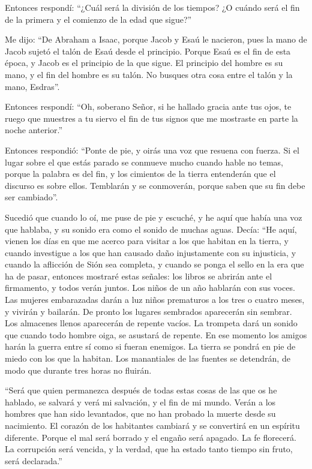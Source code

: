  Entonces respondí: ``¿Cuál será la división de los
tiempos? ¿O cuándo será el fin de la primera y el comienzo de la edad
que sigue?''

 Me dijo: ``De Abraham a Isaac, porque Jacob y Esaú le
nacieron, pues la mano de Jacob sujetó el talón de Esaú desde el
principio.  Porque Esaú es el fin de esta época, y Jacob
es el principio de la que sigue.  El principio del hombre
es su mano, y el fin del hombre es su talón. No busques otra cosa entre
el talón y la mano, Esdras''.

 Entonces respondí: ``Oh, soberano Señor, si he hallado
gracia ante tus ojos,  te ruego que muestres a tu siervo
el fin de tus signos que me mostraste en parte la noche anterior.''

 Entonces respondió: ``Ponte de pie, y oirás una voz que
resuena con fuerza.  Si el lugar sobre el que estás
parado se conmueve mucho  cuando hable no temas, porque
la palabra es del fin, y los cimientos de la tierra entenderán
 que el discurso es sobre ellos. Temblarán y se
conmoverán, porque saben que su fin debe ser cambiado''.

 Sucedió que cuando lo oí, me puse de pie y escuché, y he
aquí que había una voz que hablaba, y su sonido era como el sonido de
muchas aguas.  Decía: ``He aquí, vienen los días en que
me acerco para visitar a los que habitan en la tierra,  y
cuando investigue a los que han causado daño injustamente con su
injusticia, y cuando la aflicción de Sión sea completa, 
y cuando se ponga el sello en la era que ha de pasar, entonces mostraré
estas señales: los libros se abrirán ante el firmamento, y todos verán
juntos.  Los niños de un año hablarán con sus voces. Las
mujeres embarazadas darán a luz niños prematuros a los tres o cuatro
meses, y vivirán y bailarán.  De pronto los lugares
sembrados aparecerán sin sembrar. Los almacenes llenos aparecerán de
repente vacíos.  La trompeta dará un sonido que cuando
todo hombre oiga, se asustará de repente.  En ese momento
los amigos harán la guerra entre sí como si fueran enemigos. La tierra
se pondrá en pie de miedo con los que la habitan. Los manantiales de las
fuentes se detendrán, de modo que durante tres horas no fluirán.

 ``Será que quien permanezca después de todas estas cosas
de las que os he hablado, se salvará y verá mi salvación, y el fin de mi
mundo.  Verán a los hombres que han sido levantados, que
no han probado la muerte desde su nacimiento. El corazón de los
habitantes cambiará y se convertirá en un espíritu diferente.
 Porque el mal será borrado y el engaño será apagado.
 La fe florecerá. La corrupción será vencida, y la
verdad, que ha estado tanto tiempo sin fruto, será declarada.''


